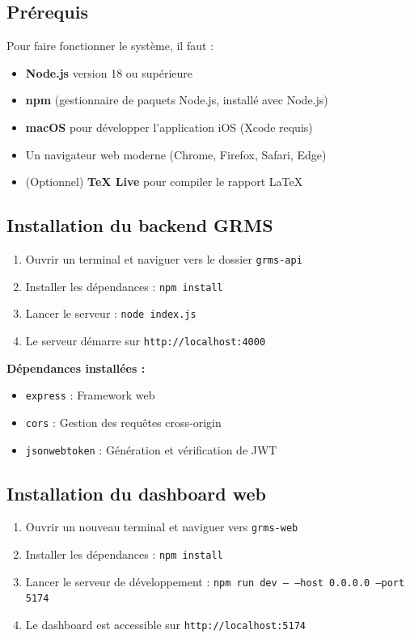 \documentclass[11pt,a4paper]{article}
\begin{document}
\subsection{Prérequis}

Pour faire fonctionner le système, il faut :

\begin{itemize}
    \item \textbf{Node.js} version 18 ou supérieure
    \item \textbf{npm} (gestionnaire de paquets Node.js, installé avec Node.js)
    \item \textbf{macOS} pour développer l'application iOS (Xcode requis)
    \item Un navigateur web moderne (Chrome, Firefox, Safari, Edge)
    \item (Optionnel) \textbf{TeX Live} pour compiler le rapport LaTeX
\end{itemize}

\subsection{Installation du backend GRMS}

\begin{enumerate}
    \item Ouvrir un terminal et naviguer vers le dossier \texttt{grms-api}
    \item Installer les dépendances : \texttt{npm install}
    \item Lancer le serveur : \texttt{node index.js}
    \item Le serveur démarre sur \texttt{http://localhost:4000}
\end{enumerate}

\textbf{Dépendances installées :}
\begin{itemize}
    \item \texttt{express} : Framework web
    \item \texttt{cors} : Gestion des requêtes cross-origin
    \item \texttt{jsonwebtoken} : Génération et vérification de JWT
\end{itemize}

\subsection{Installation du dashboard web}

\begin{enumerate}
    \item Ouvrir un nouveau terminal et naviguer vers \texttt{grms-web}
    \item Installer les dépendances : \texttt{npm install}
    \item Lancer le serveur de développement : \texttt{npm run dev -- --host 0.0.0.0 --port 5174}
    \item Le dashboard est accessible sur \texttt{http://localhost:5174}
\end{enumerate}
\end{document}
